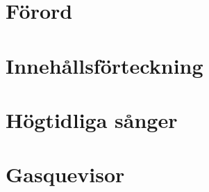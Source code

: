 \documentclass[8pt,twoside]{extreport} %
\begin{document}
\chapter{Förord}



\newpage

\chapter{Innehållsförteckning}
\makeatletter
{}
\makeatother

\newpage


\chapter{Högtidliga sånger}
\newpage





\newpage









\newpage


\chapter{Gasquevisor}
\newpage









\newpage





\newpage



\newpage
\end{document}
